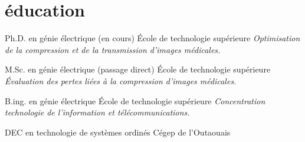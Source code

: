 \documentclass[]{friggeri-cv}
\newif\ifenglish
\begin{document}

\ifenglish\section{education}\else\section{éducation}\fi

\begin{entrylist}
  \ifenglish
    \entry {since 2011} {Ph.D. in electrical engineering} {École de technologie supérieure} {\emph{Medical image compression and transmission optimization.}}
  \else
     {Ph.D. en génie électrique (en cours)} {École de technologie supérieure} {\emph{Optimisation de la compression et de la transmission d'images médicales.}}
  \fi

  \ifenglish
    \entry {2009-2010} {M.Sc. in electrical engineering (incomplete)} {École de technologie supérieure} {\emph{Evaluation of the diagnostic quality of lossy compressed images.}}
  \else
     {M.Sc. en génie électrique (passage direct)} {École de technologie supérieure} {\emph{Évaluation des pertes liées à la compression d'images médicales.}}
  \fi

  \ifenglish
    \entry {2005-2009} {B.ing. in electrical engineering} {École de technologie supérieure} {\emph{Specialization in information technologies and telecommunication.}}
  \else
     {B.ing. en génie électrique} {École de technologie supérieure} {\emph{Concentration technologie de l'information et télécommunications.}}
  \fi

  \ifenglish
    \entry {2001-2005} {DEC in computerized systems technology} {Cégep de l’Outaouais} {}
  \else
     {DEC en technologie de systèmes ordinés} {Cégep de l’Outaouais} {}
  \fi
\end{entrylist}


\end{document}
